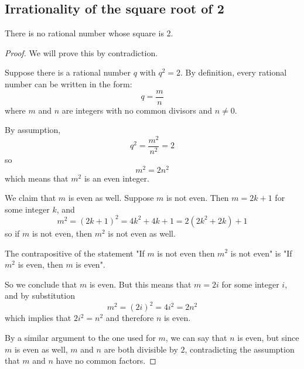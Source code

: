 \subsection{Irrationality of the square root of 2}
\begin{theorem}
There is no rational number whose square is 2.
\end{theorem}

\begin{proof} 
We will prove this by contradiction.  
\par\vspace{0.3 cm}
Suppose there is a rational number $q$ with $q^2=2$.  By definition, every rational number can be written in the form:
\[
q = \frac{m}{n} 
\]
where $m$ and $n$ are integers with no common divisors and $n\neq0$.
\par\vspace{0.3 cm}
By assumption,
\[
q^2 = \frac{m^2}{n^2} = 2
\]
so
\[
m^2 = 2n^2
\]
which means that $m^2$ is an even integer.  
\par\vspace{0.3 cm}
We claim that $m$ is even as well.  Suppose $m$ is not even.  Then $m=2k+1$ for some integer $k$, and 
\[
m^2 = (2k+1)^2 = 4k^2+4k+1 = 2(2k^2+2k)+1
\]
so if $m$ is not even, then $m^2$ is not even as well.  
\par\vspace{0.3 cm}
The contrapositive of the statement "If $m$ is not even then $m^2$ is not even" is "If $m^2$ is even, then $m$ is even".
\par\vspace{0.3 cm}
So we conclude that $m$ is even.  But this means that $m = 2i$ for some integer $i$, and by substitution
\[
m^2 = (2i)^2 = 4i^2 =2n^2
\]
which implies that $2i^2 = n^2$ and therefore $n$ is even.  
\par\vspace{0.3 cm}
By a similar argument to the one used for $m$, we can say that $n$ is even, but since $m$ is even as well, $m$ and $n$ are both divisible by $2$, contradicting the assumption that $m$ and $n$ have no common factors.
\end{proof}

